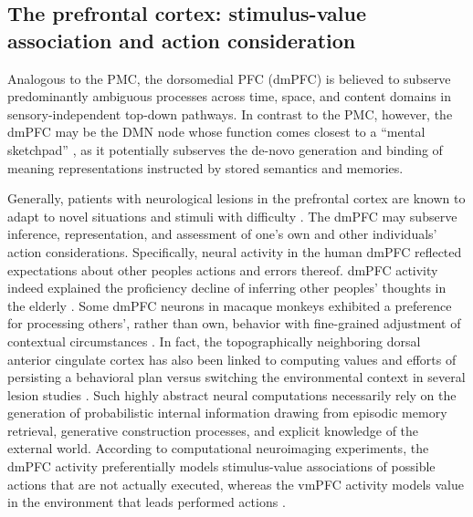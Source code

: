 \documentclass[10pt,letterpaper]{article}
\begin{document}
\subsection{The prefrontal cortex: stimulus-value association and action consideration}
Analogous to the PMC,
the dorsomedial PFC (dmPFC) is believed to subserve predominantly ambiguous processes
across time, space, and content domains in
sensory-independent top-down pathways.
In contrast to the PMC, however,
the dmPFC may be the DMN node whose function comes closest to a
``mental sketchpad'' \citep{goldman1996prefrontal}, as it
potentially subserves the de-novo generation and binding
of meaning representations instructed by stored semantics and memories.



Generally,
patients with neurological lesions in the prefrontal cortex
are known to adapt to novel situations and stimuli with difficulty
\citep{stuss1986frontal}.
The dmPFC may subserve inference, representation, and assessment
of one's own and other individuals' action considerations.
Specifically, neural activity in the human dmPFC
reflected expectations about other peoples actions and errors thereof.
dmPFC activity indeed explained the proficiency decline
of inferring other peoples' thoughts in the elderly \citep{moran2012social}.
Some dmPFC neurons in macaque monkeys exhibited a preference
for processing others', rather than own, behavior
with fine-grained adjustment of contextual circumstances \citep{yoshida2010neural}.
In fact, the topographically neighboring dorsal anterior cingulate cortex
has also been linked to computing values and efforts of
persisting a behavioral plan versus switching the
environmental context in several lesion studies \citep{kolling2016value}.
%
Such highly abstract neural computations necessarily rely on the
generation of probabilistic internal information drawing from
episodic memory retrieval, generative construction processes,
and explicit knowledge of the external world.
%
According to computational neuroimaging experiments,
the dmPFC activity preferentially models stimulus-value associations of
possible actions that are not actually executed,
whereas the vmPFC activity models value in the environment that leads performed actions
\citep{nicolle2012agent}.
\end{document}
